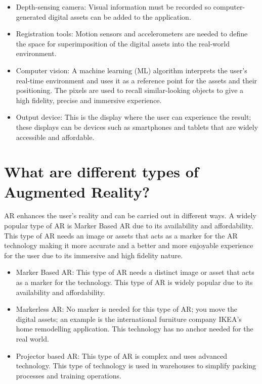 \begin{itemize}
  \item Depth-sensing camera: Visual information must be recorded so computer-generated digital assets can be added to the application.
  \item Registration tools: Motion sensors and accelerometers are needed to define the space for superimposition of the digital assets into the real-world environment.
  \item Computer vision: A machine learning (ML) algorithm interprets the user's real-time environment and uses it as a reference point for the assets and their positioning. The pixels are used to recall similar-looking objects to give a high fidelity, precise and immersive experience. 
  \item Output device: This is the display where the user can experience the result; these displays can be devices such as smartphones and tablets that are widely accessible and affordable.
\end{itemize}

 \section{What are different types of Augmented Reality?}

AR enhances the user’s reality and can be carried out in different ways. 
A widely popular type of AR is Marker Based AR due to its availability and affordability. This type of AR needs an image or assets that acts as a marker for the AR technology making it more accurate and a better and more enjoyable experience for the user due to its immersive and high fidelity nature. 
\begin{itemize}
  \item Marker Based AR: This type of AR needs a distinct image or asset that acts as a marker for the technology. This type of AR is widely popular due to its availability and affordability. 
  \item Markerless AR: No marker is needed for this type of AR; you move the digital assets; an example is the international furniture company IKEA’s home remodelling application. This technology has no anchor needed for the real world.
  \item Projector based AR: This type of AR is complex and uses advanced technology. This type of technology is used in warehouses to simplify packing processes and training operations.
\end{itemize}

